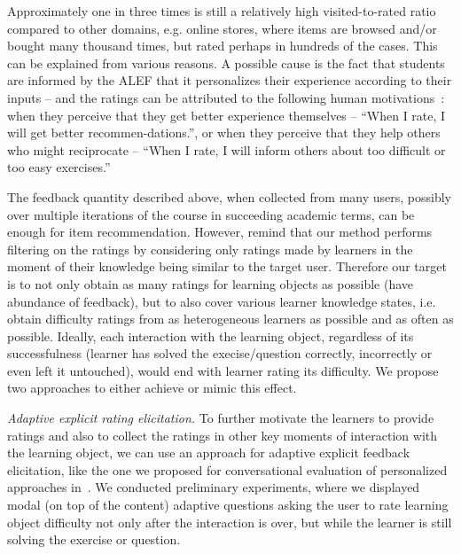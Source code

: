 \documentclass{llncs}
\begin{document}
Approximately one in three times is still a relatively high visited-to-rated ratio compared to other domains, e.g. online stores, where items are browsed and/or bought many thousand times, but rated perhaps in hundreds of the cases. This can be explained from various reasons. A possible cause is the fact that students are informed by the ALEF that it personalizes their experience according to their inputs – and the ratings can be attributed to the following human motivations~\cite{9.}: when they perceive that they get better experience themselves – ``When I rate, I will get better recommen-dations.'', or when they perceive that they help others who might reciprocate – ``When I rate, I will inform others about too difficult or too easy exercises.''

The feedback quantity described above, when collected from many users, possibly over multiple iterations of the course in succeeding academic terms, can be enough for item recommendation. However, remind that our method performs filtering on the ratings by considering only ratings made by learners in the moment of their knowledge being similar to the target user. Therefore our target is to not only obtain as many ratings for learning objects as possible (have abundance of feedback), but to also cover various learner knowledge states, i.e. obtain difficulty ratings from as heterogeneous learners as possible and as often as possible. Ideally, each interaction with the learning object, regardless of its successfulness (learner has solved the execise/question correctly, incorrectly or even left it untouched), would end with learner rating its difficulty. We propose two approaches to either achieve or mimic this effect.

\emph{Adaptive explicit rating elicitation.} To further motivate the learners to provide ratings and also to collect the ratings in other key moments of interaction with the learning object, we can use an approach for adaptive explicit feedback elicitation, like the one we proposed for conversational evaluation of personalized approaches in~\cite{10.}. We conducted preliminary experiments, where we displayed modal (on top of the content) adaptive questions asking the user to rate learning object difficulty not only after the interaction is over, but while the learner is still solving the exercise or question.
\end{document}
